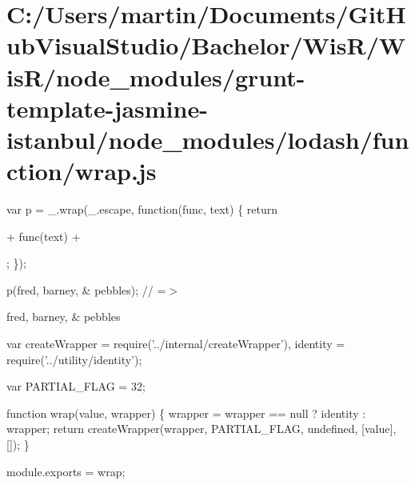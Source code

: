 \hypertarget{_c_1_2_users_2martin_2_documents_2_git_hub_visual_studio_2_bachelor_2_wis_r_2_wis_r_2node_module68a061d7381898f8fcfb5d97c2323ccc}{}\section{C\+:/\+Users/martin/\+Documents/\+Git\+Hub\+Visual\+Studio/\+Bachelor/\+Wis\+R/\+Wis\+R/node\+\_\+modules/grunt-\/template-\/jasmine-\/istanbul/node\+\_\+modules/lodash/function/wrap.\+js}
var p = \+\_\+.\+wrap(\+\_\+.\+escape, function(func, text) \{ return \textquotesingle{}

\textquotesingle{} + func(text) + \textquotesingle{}

\textquotesingle{}; \});

p(\textquotesingle{}fred, barney, \& pebbles\textquotesingle{}); // =$>$ \textquotesingle{}

fred, barney, \& pebbles

\textquotesingle{}


\begin{DoxyCodeInclude}
var createWrapper = require(\textcolor{stringliteral}{'../internal/createWrapper'}),
    identity = require(\textcolor{stringliteral}{'../utility/identity'});

var PARTIAL\_FLAG = 32;

\textcolor{keyword}{function} wrap(value, wrapper) \{
  wrapper = wrapper == null ? identity : wrapper;
  \textcolor{keywordflow}{return} createWrapper(wrapper, PARTIAL\_FLAG, undefined, [value], []);
\}

module.exports = wrap;
\end{DoxyCodeInclude}
 